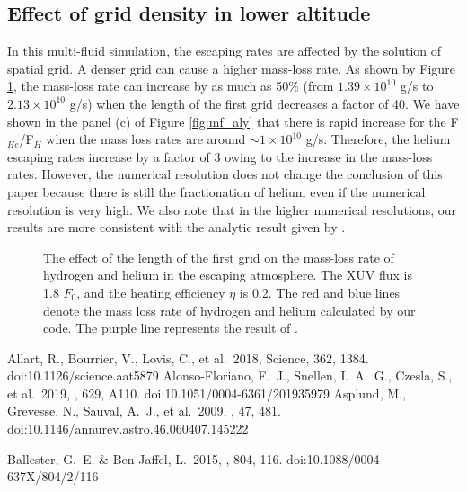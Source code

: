 \documentclass[journal, onecolumn]{aastex631}
\begin{document}
\begin{CJK*}{UTF8}{gbsn}
\begin{appendix}
\section{Effect of grid density in lower altitude} \label{app:grid}
In this multi-fluid simulation, the escaping rates are affected by the solution of spatial grid. A denser grid can cause a higher mass-loss rate. As shown by Figure \ref{fig:grid_aly}, the mass-loss rate can increase by as much as 50\% (from $1.39\times 10^{10}$ g/s to $2.13\times 10^{10}$ g/s) when the length of the first grid decreases a factor of 40. We have shown in the panel (c) of Figure \ref{fig:mf_aly} that there is rapid increase for the F$_{He}$/F$_{H}$ when the mass loss rates are around $\sim 1\times 10^{10}$ g/s. Therefore, the helium escaping rates increase by a factor of 3 owing to the increase in the mass-loss rates. However, the numerical resolution does not change the conclusion of this paper because there is still the fractionation of helium even if the numerical resolution is very high. We also note that in the higher numerical resolutions, our results are more consistent with the analytic result given by \cite{Hunten1987}.

\begin{figure}[ht!]
\caption{The effect of the length of the first grid on the mass-loss rate of hydrogen and helium in the escaping atmosphere. The XUV flux is 1.8 $F_0$, and the heating efficiency $\eta$ is 0.2. The red and blue lines denote the mass loss rate of hydrogen and helium calculated by our code. The purple line represents the result of \cite{Hunten1987}.
}
\label{fig:grid_aly}
\end{figure}

\end{appendix}



\begin{thebibliography}{99}

 Allart, R., Bourrier, V., Lovis, C., et al.\ 2018, Science, 362, 1384. doi:10.1126/science.aat5879
 Alonso-Floriano, F.~J., Snellen, I.~A.~G., Czesla, S., et al.\ 2019, \aap, 629, A110. doi:10.1051/0004-6361/201935979
 Asplund, M., Grevesse, N., Sauval, A.~J., et al.\ 2009, \araa, 47, 481. doi:10.1146/annurev.astro.46.060407.145222


 Ballester, G.~E. \& Ben-Jaffel, L.\ 2015, \apj, 804, 116. doi:10.1088/0004-637X/804/2/116


\end{thebibliography}
\end{CJK*}
\end{document}
